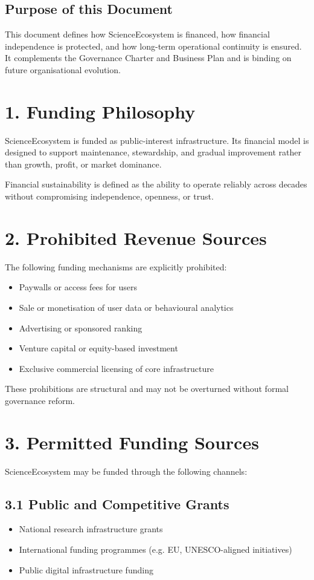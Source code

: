 \subsection*{Purpose of this Document}
This document defines how ScienceEcosystem is financed, how financial independence is protected, and how long-term operational continuity is ensured. It complements the Governance Charter and Business Plan and is binding on future organisational evolution.

\section*{1. Funding Philosophy}

ScienceEcosystem is funded as public-interest infrastructure. Its financial model is designed to support maintenance, stewardship, and gradual improvement rather than growth, profit, or market dominance.

Financial sustainability is defined as the ability to operate reliably across decades without compromising independence, openness, or trust.

\section*{2. Prohibited Revenue Sources}

The following funding mechanisms are explicitly prohibited:
\begin{itemize}
    \item Paywalls or access fees for users
    \item Sale or monetisation of user data or behavioural analytics
    \item Advertising or sponsored ranking
    \item Venture capital or equity-based investment
    \item Exclusive commercial licensing of core infrastructure
\end{itemize}

These prohibitions are structural and may not be overturned without formal governance reform.

\section*{3. Permitted Funding Sources}

ScienceEcosystem may be funded through the following channels:

\subsection*{3.1 Public and Competitive Grants}
\begin{itemize}
    \item National research infrastructure grants
    \item International funding programmes (e.g. EU, UNESCO-aligned initiatives)
    \item Public digital infrastructure funding
\end{itemize}

